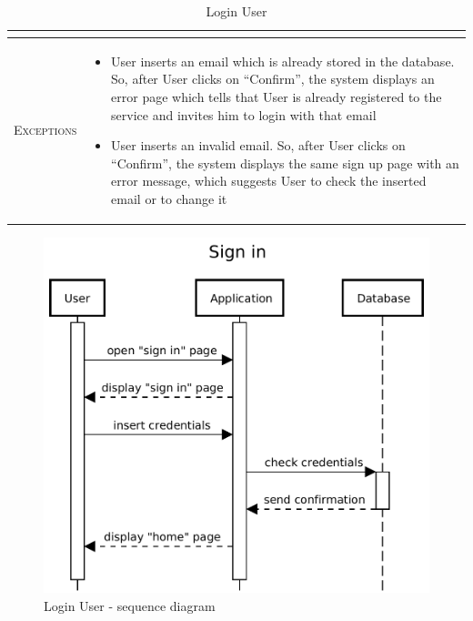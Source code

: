 \begin{table}[H]
\begin{tabular}[c]{|l|p{}|}
\begin{itemize}
    	\end{itemize}\\
    	\hline %
    	\textsc{Exceptions}         &  \begin{itemize}
    	    \item User inserts an email which is already stored in the database. So, after User clicks on “Confirm”, the system displays an error page which tells that User is already registered to the service and invites him to login with that email
            \item User inserts an invalid email. So, after User clicks on “Confirm”, the system displays the same sign up page with an error message, which suggests User to check the inserted email or to change it

    	\end{itemize}\\
    	\hline %
        
    \end{tabular}

 

    
    \caption{\label{tab:user_login}Login User}
\end{table}

\begin{figure}[H]
    \centering
    \includegraphics[scale=0.5]{Images/Sequence diagrams/User - sign in.pdf}
    \caption{Login User - sequence diagram}
    \label{fig:my_label}
\end{figure}

